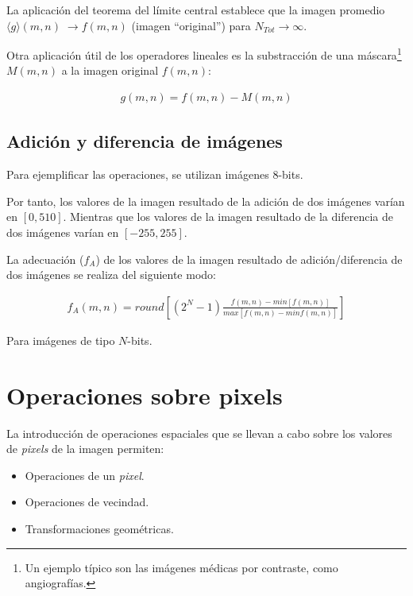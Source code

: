La aplicaci\'on del teorema del l\'imite central establece que la imagen promedio $\langle g \rangle (m, n) \; \rightarrow f(m, n)$ (imagen ``original'')
para $N_{Tot} \rightarrow \infty$.
%

%
Otra aplicaci\'on \'util de los operadores lineales es la substracci\'on de una m\'ascara\footnote{Un ejemplo t\'ipico son las im\'agenes m\'edicas por
contraste, como angiograf\'ias.} $M(m, n)$ a la imagen original $f(m, n)$:

\begin{eqnarray}
	g (m, n) = f(m, n) - M(m, n)
\label{EqXXXIX}
\end{eqnarray}


\subsection{Adici\'on y diferencia de im\'agenes}

Para ejemplificar las operaciones, se utilizan im\'agenes 8-bits.
%

%
Por tanto, los valores de la imagen resultado de la adici\'on de dos im\'agenes var\'ian en $[0, 510]$.
%
Mientras que los valores de la imagen resultado de la diferencia de dos im\'agenes var\'ian en $[-255, 255]$.
%

%
La adecuaci\'on ($f_{A}$) de los valores de la imagen resultado de adici\'on/diferencia de dos im\'agenes se realiza del siguiente modo:

\begin{eqnarray}
	f_{A} (m, n) = round \left[ \left( 2^{N} - 1 \right)
                \frac{f(m, n) - min{ \left[ f(m, n) \right] }}{max{ \left[ f(m, n) - min{f(m, n)} \right] }} \right]
\label{EqXL}
\end{eqnarray}

Para im\'agenes de tipo $N$-bits.

\section{Operaciones sobre pixels}

La introducci\'on de operaciones espaciales que se llevan a cabo sobre los valores de \textit{pixels} de la imagen permiten:

\begin{itemize}
 \item Operaciones de un \textit{pixel}.
 \item Operaciones de vecindad.
 \item Transformaciones geom\'etricas.
\end{itemize}


